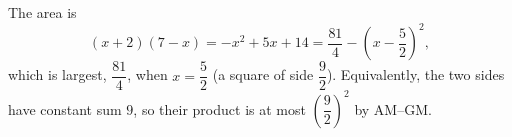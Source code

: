 The area is
\[(x+2)(7-x)=-x^2+5x+14=\dfrac{81}{4}-\left(x-\dfrac52\right)^2,\]
which is largest, $\boxed{\dfrac{81}{4}}$, when $x=\dfrac52$ (a square of side $\dfrac92$). Equivalently, the two sides have constant sum $9$, so their product is at most $\left(\dfrac92\right)^2$ by AM--GM.
